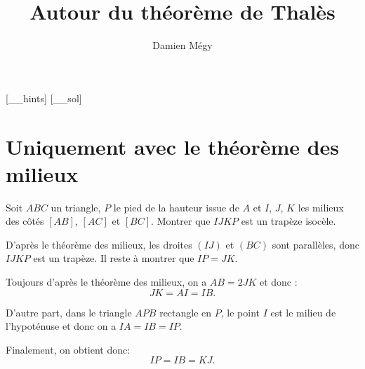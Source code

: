 




[_\jobname_hints]
[_\jobname_sol]


\title{Autour du théorème de Thalès}
\author{Damien Mégy}
\maketitle

\avertissement 


\tableofcontents

\section{Uniquement avec le théorème des milieux}



\begin{exo}[Trapèze isocèle]%
Soit $ABC$ un triangle,  $P$ le pied de la hauteur issue de $A$ et $I$, $J$, $K$  les milieux des côtés $[AB]$, $[AC]$ et $[BC]$.
Montrer que $IJKP$ est un trapèze isocèle.
\begin{center}
\end{center}

\begin{sol}

D'après le théorème des milieux, les droites $(IJ)$ et $(BC)$ sont parallèles, donc $IJKP$ est un trapèze.
Il reste à montrer que $IP=JK$.

Toujours d'après le théorème des milieux, on a $AB=2JK$ et donc :
\[ JK=AI=IB.\]

D'autre part, dans le triangle $APB$ rectangle en $P$, le point $I$ est le milieu de l'hypoténuse et donc on a $IA=IB=IP$.

Finalement, on obtient donc:
\[ IP=IB=KJ.\]



\end{sol}
\end{exo} 



